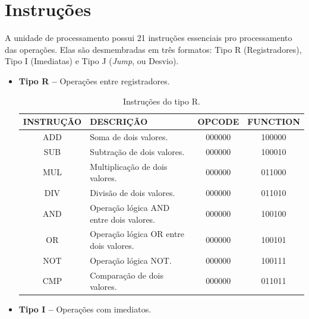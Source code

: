 \documentclass{report}
\begin{document}
  \section{Instruções}
  
  A unidade de processamento possui 21 instruções essenciais pro processamento das operações. Elas são desmembradas em três formatos: Tipo R (Registradores), Tipo I (Imediatas) e Tipo J (\textit{Jump}, ou Desvio).
  
  \begin{itemize}
    \item \textbf{Tipo R --} Operações entre registradores.
    
	\begin{table}[H]
	\centering
	\begin{tabular}{|c|m{6cm}|c|c|}
  	\hline 
  	\textbf{INSTRUÇÃO} & \textbf{DESCRIÇÃO} & \textbf{OPCODE} & \textbf{FUNCTION} \\ 
  	\hline   	
  	ADD & Soma de dois valores. & 000000 & 100000 \\ \hline
  	SUB & Subtração de dois valores. & 000000 & 100010 \\ \hline
  	MUL & Multiplicação de dois valores. & 000000 & 011000 \\ \hline
  	DIV & Divisão de dois valores. & 000000 & 011010 \\ \hline
  	AND & Operação lógica AND entre dois valores. & 000000 & 100100 \\ \hline
  	OR  & Operação lógica OR entre dois valores. & 000000 & 100101 \\ \hline
  	NOT & Operação lógica NOT. & 000000 & 100111 \\ \hline
  	CMP & Comparação de dois valores. & 000000 & 011011 \\ \hline
  	\end{tabular} 
  	\caption{Instruções do tipo R.}
  \end{table}
  \newpage    

    \item \textbf{Tipo I --} Operações com imediatos.
    

\end{itemize}
\end{document}
